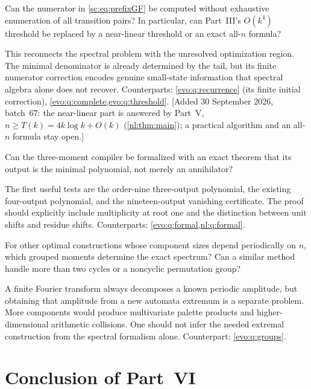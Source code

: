 \documentclass[11pt,a4paper]{article}
\numberwithin{equation}{section}
\theoremstyle{definition}
\theoremstyle{remark}
\begin{document}
\begin{question}\label{sc:q:prefix}
Can the numerator in \eqref{sc:eq:prefixGF} be computed without exhaustive
enumeration of all transition pairs? In particular, can Part~III's
$O(k^4)$ threshold be replaced by a near-linear threshold or an exact
all-$n$ formula?
\end{question}
This reconnects the spectral problem with the unresolved optimization
region. The minimal denominator is already determined by the tail, but
its finite numerator correction encodes genuine small-state information
that spectral algebra alone does not recover.
Counterparts: \cref{evo:q:recurrence} (its finite initial correction), \cref{evo:q:complete,evo:q:threshold}. [Added 30 September 2026, batch~67: the near-linear part is answered by Part~V, $n\ge T(k)=4k\log k+O(k)$ (\cref{nl:thm:main}); a practical algorithm and an all-$n$ formula stay open.]

\begin{question}\label{sc:q:certificates}
Can the three-moment compiler be formalized with an exact theorem that
its output is the minimal polynomial, not merely an annihilator?
\end{question}
The first useful tests are the order-nine three-output polynomial, the
existing four-output polynomial, and the nineteen-output vanishing
certificate. The proof should explicitly include multiplicity at root one
and the distinction between unit shifts and residue shifts.
Counterparts: \cref{evo:q:formal,nl:q:formal}.

\begin{question}\label{sc:q:beyond}
For other optimal constructions whose component sizes depend periodically
on $n$, which grouped moments determine the exact spectrum? Can a similar
method handle more than two cycles or a noncyclic permutation group?
\end{question}
A finite Fourier transform always decomposes a known periodic amplitude,
but obtaining that amplitude from a new automata extremum is a separate
problem. More components would produce multivariate palette products and
higher-dimensional arithmetic collisions. One should not infer the needed
extremal construction from the spectral formalism alone.
Counterpart: \cref{evo:q:groups}.

\section{Conclusion of Part~VI}\label{sc:sec:conclusion}
\end{document}
